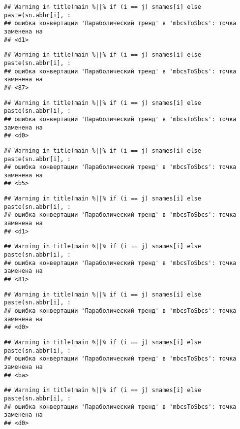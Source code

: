 \documentclass[
]{article}
\begin{document}
\begin{verbatim}
## Warning in title(main %||% if (i == j) snames[i] else paste(sn.abbr[i], :
## ошибка конвертации 'Параболический тренд' в 'mbcsToSbcs': точка заменена на
## <d1>
\end{verbatim}

\begin{verbatim}
## Warning in title(main %||% if (i == j) snames[i] else paste(sn.abbr[i], :
## ошибка конвертации 'Параболический тренд' в 'mbcsToSbcs': точка заменена на
## <87>
\end{verbatim}

\begin{verbatim}
## Warning in title(main %||% if (i == j) snames[i] else paste(sn.abbr[i], :
## ошибка конвертации 'Параболический тренд' в 'mbcsToSbcs': точка заменена на
## <d0>
\end{verbatim}

\begin{verbatim}
## Warning in title(main %||% if (i == j) snames[i] else paste(sn.abbr[i], :
## ошибка конвертации 'Параболический тренд' в 'mbcsToSbcs': точка заменена на
## <b5>
\end{verbatim}

\begin{verbatim}
## Warning in title(main %||% if (i == j) snames[i] else paste(sn.abbr[i], :
## ошибка конвертации 'Параболический тренд' в 'mbcsToSbcs': точка заменена на
## <d1>
\end{verbatim}

\begin{verbatim}
## Warning in title(main %||% if (i == j) snames[i] else paste(sn.abbr[i], :
## ошибка конвертации 'Параболический тренд' в 'mbcsToSbcs': точка заменена на
## <81>
\end{verbatim}

\begin{verbatim}
## Warning in title(main %||% if (i == j) snames[i] else paste(sn.abbr[i], :
## ошибка конвертации 'Параболический тренд' в 'mbcsToSbcs': точка заменена на
## <d0>
\end{verbatim}

\begin{verbatim}
## Warning in title(main %||% if (i == j) snames[i] else paste(sn.abbr[i], :
## ошибка конвертации 'Параболический тренд' в 'mbcsToSbcs': точка заменена на
## <ba>
\end{verbatim}

\begin{verbatim}
## Warning in title(main %||% if (i == j) snames[i] else paste(sn.abbr[i], :
## ошибка конвертации 'Параболический тренд' в 'mbcsToSbcs': точка заменена на
## <d0>
\end{verbatim}
\end{document}
